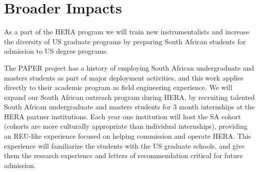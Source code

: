 \documentclass[preprint]{aastex}
\begin{document}
\vspace{-0.25in}
\section{Broader Impacts}
\label{BIsec}
As a part of the HERA program we will train new instrumentalists and increase
the diversity of US graduate programs by preparing South African students for
admission to US degree programs.

The PAPER project has a history of employing South African undergraduate and
masters students as part of major deployment activities, and this work applies
directly to their academic program as field engineering experience.  We will
expand our South African outreach program during HERA, by recruiting talented
South African undergraduate and masters students for 3 month internships at the
HERA partner institutions. Each year one institution will host the SA cohort
(cohorts are more culturally appropriate than individual internships),
providing an REU-like experience focused on helping commission and operate
HERA. This experience will familiarize the students with the US graduate
schools, and give them the research experience and letters of recommendation
critical for future admission. 
\end{document}
